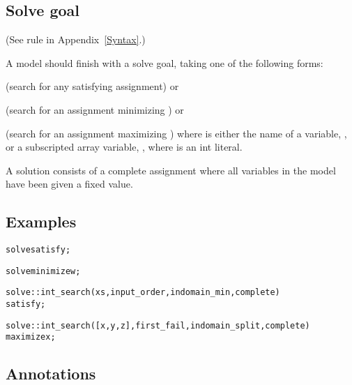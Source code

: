 \documentclass[a4paper]{article}
\begin{document}
\subsection{Solve goal}

(See rule  in Appendix~\ref{Syntax}.)

A model should finish with a solve goal, taking one of the following forms:


(search for any satisfying assignment) or


(search for an assignment minimizing \fzobjfn) or


(search for an assignment maximizing \fzobjfn) where \fzobjfn{} is either
the name of a variable, \fzv, or a subscripted array variable, \fzvj,
where \fzj{} is an int literal.

A solution consists of a complete assignment where all variables in the
model have been given a fixed value.

\subsection*{Examples}

\begin{alltt}

solve satisfy;      % Find any solution using the default strategy.

solve minimize w;   % Find a solution minimizing w, using the default strategy.

    % First label the variables in xs in the order x[1], x[2], ...
    % trying values in ascending order.
solve :: int_search(xs, input_order, indomain_min, complete)
    satisfy;    % Find any solution.

    % First use first-fail on these variables, splitting domains
    % at each choice point.
solve :: int_search([x, y, z], first_fail, indomain_split, complete)
    maximize x; % Find a solution maximizing x.


\end{alltt}

\subsection{Annotations}
\end{document}
